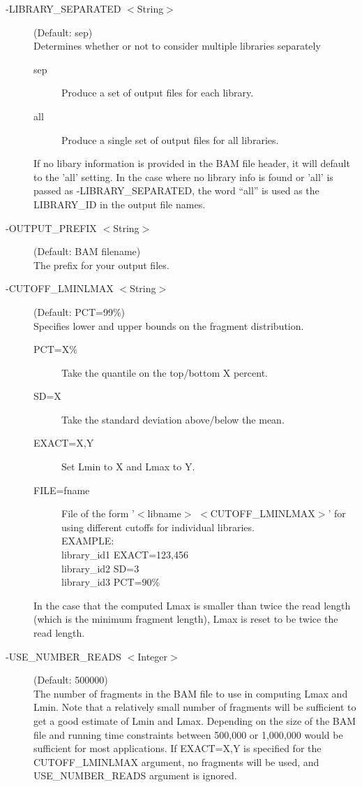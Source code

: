 \documentclass[11pt]{article}
\begin{document}
\begin{description}
\item[-LIBRARY\_SEPARATED $<$String$>$] (Default: sep)\\
Determines whether or not to consider multiple libraries separately
\begin{description}
\item[sep] Produce a set of output files for each library.
\item[all] Produce a single set of output files for all libraries.
\end{description}
If no libary information is provided in the BAM file header, it will default to the 'all' setting. In the case where no library info is found or 'all' is passed as -LIBRARY\_SEPARATED, the word ``all'' is used as the LIBRARY\_ID in the output file names.

\item[-OUTPUT\_PREFIX $<$String$>$] (Default: BAM filename)\\
The prefix for your output files.

\item[-CUTOFF\_LMINLMAX $<$String$>$] (Default: PCT=99\%)\\
Specifies lower and upper bounds on the fragment distribution.
\begin{description}
\item[PCT=X\%] Take the quantile on the top/bottom X percent. 
\item[SD=X] Take the standard deviation above/below the mean.
\item[EXACT=X,Y] Set Lmin to X and Lmax to Y.
\item[FILE=fname] File of the form '$<$libname$>$ $<$CUTOFF\_LMINLMAX$>$' for using different cutoffs for individual libraries.\\
\noindent EXAMPLE: \\
\noindent library\_id1 EXACT=123,456\\
\noindent library\_id2 SD=3\\
\noindent library\_id3 PCT=90\%
\end{description}
In the case that the computed Lmax is smaller than twice the read length (which is the minimum fragment length), Lmax is reset to be twice the read length.

\item[-USE\_NUMBER\_READS $<$Integer$>$] (Default: 500000)\\
The number of fragments in the BAM file to use in computing Lmax and Lmin. Note that a relatively small number of fragments will be sufficient to get a good estimate of Lmin and Lmax.
Depending on the size of the BAM file and running time
constraints between 500,000 or 1,000,000 would be
sufficient for most applications. If EXACT=X,Y is 
specified for the CUTOFF\_LMINLMAX argument, no fragments
will be used, and USE\_NUMBER\_READS argument is ignored. 


\end{description}
\end{document}
